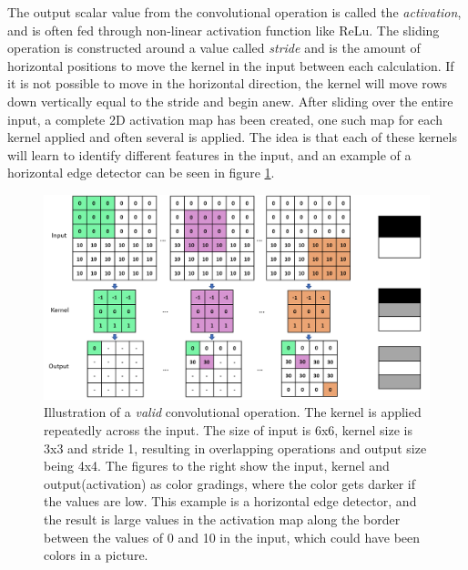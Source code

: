      The output scalar value from the convolutional operation is called the \textit{activation}, and is often fed through non-linear activation function like ReLu\cite{o2015introduction_convolutions}. The sliding operation is constructed around a value called \textit{stride} and is the amount of horizontal positions to move the kernel in the input between each calculation. If it is not possible to move in the horizontal direction, the kernel will move rows down vertically equal to the stride and begin anew. After sliding over the entire input, a complete 2D activation map has been created, one such map for each kernel applied and often several is applied. The idea is that each of these kernels will learn to identify different features in the input, and an example of a horizontal edge detector can be seen in figure \ref{convolutional_fig}. 
    \clearpage
    \begin{figure}[H]
        \centering
        \includegraphics[scale=0.4]{figures/convolutions.png}
        \caption[Horizontal edge detector example]{Illustration of a \textit{valid} convolutional operation. The kernel is applied repeatedly across the input. The size of input is 6x6, kernel size is 3x3 and stride 1, resulting in overlapping operations and output size being 4x4. The figures to the right show the input, kernel and output(activation) as color gradings, where the color gets darker if the values are low. This example is a horizontal edge detector, and the result is large values in the activation map along the border between the values of 0 and 10 in the input, which could have been colors in a picture.}
      	\medskip 
        \label{convolutional_fig}
    \end{figure}
    
